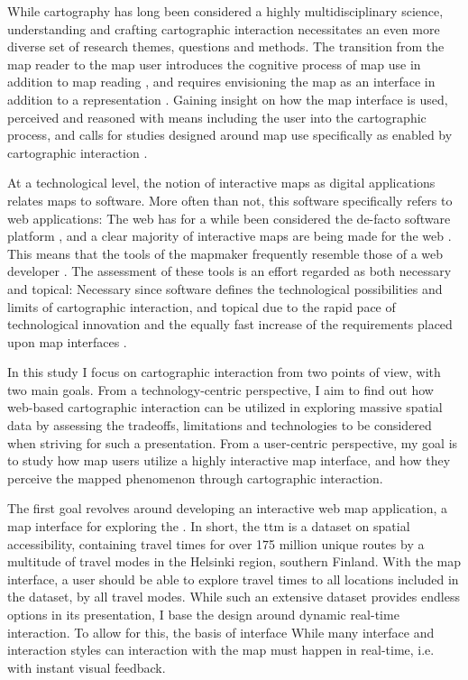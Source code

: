 While cartography has long been considered a highly multidisciplinary science,
understanding and crafting cartographic interaction necessitates an even
more diverse set of research themes, questions and methods.
The transition from the map reader to the map user
introduces the cognitive process of map use in addition to map reading
\parencite{mac2015, liu2010},
and requires envisioning the map as an interface in addition to a representation
\parencite{rot2013b}.
Gaining insight on how the map interface is used, perceived and reasoned with
means including the user into the cartographic process,
and calls for studies designed around map use specifically as enabled by cartographic interaction
\parencite{rot2017}.

At a technological level,
the notion of interactive maps as digital applications relates maps to software.
More often than not, this software specifically refers to web applications:
The web has for a while been considered the de-facto software platform \parencite{tai2017, mik2019},
and a clear majority of interactive maps are being made for the web \parencite{vee2017}.
This means that the tools of the mapmaker
frequently resemble those of a web developer \parencite{rot2021}.
The assessment of these tools is an effort regarded as both necessary
and topical:
Necessary since software defines the technological possibilities and limits
of cartographic interaction,
and topical due to the rapid pace of technological innovation
and the equally fast increase of the requirements placed upon map interfaces
\parencite{rot2014, rot2021}.

In this study I focus on cartographic interaction from two points of view,
with two main goals.
From a technology-centric perspective,
I aim to find out how web-based cartographic interaction can be utilized in exploring
massive spatial data by
assessing the tradeoffs, limitations and technologies to be considered when
striving for such a presentation. %
From a user-centric perspective,
my goal is to study how
map users utilize a highly interactive map interface,
and how they perceive the mapped phenomenon
through cartographic interaction.

The first goal revolves around developing an interactive web map application,
a map interface for exploring the  \parencite{fin2023}.
In short, the \acrshort{ttm} is a dataset on spatial accessibility,
containing travel times for
over 175 million unique routes by a multitude of travel modes
in the Helsinki region, southern Finland.
With the map interface,
a user should be able to explore travel times to all locations included in the dataset,
by all travel modes.
While such an extensive dataset provides endless options in its presentation,
I base the design around dynamic real-time interaction.
To allow for this, the basis of interface
While many interface and interaction styles can
interaction with the map must happen in real-time,
i.e. with instant visual feedback.

